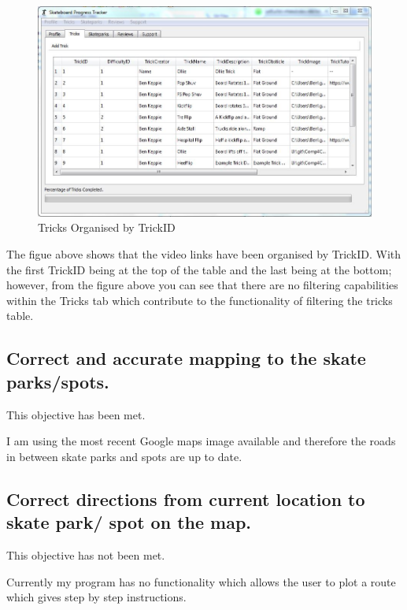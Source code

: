 \begin{figure}[H]
    \includegraphics[width=\textwidth]{./Evaluation/images/OrganisedTricks.jpg}
    \caption{Tricks Organised by TrickID} \label{fig:TricksOrganised}
\end{figure}

The figue above shows that the video links have been organised by TrickID. With the first TrickID being at the top of the table and the last being at the bottom; however, from the figure above you can see that there are no filtering capabilities within the Tricks tab which contribute to the functionality of filtering the tricks table.




\subsection{Correct and accurate mapping to the skate parks/spots.}

This objective has been met.

I am using the most recent Google maps image available and therefore the roads in between skate parks and spots are up to date.



\subsection {Correct directions from current location to skate park/ spot on the map.}

This objective has not been met.

Currently my program has no functionality which allows the user to plot a route which gives step by step instructions.




